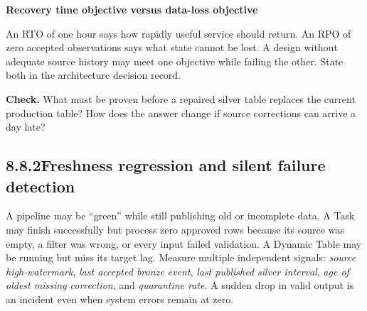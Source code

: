 \documentclass[11pt,twoside]{article}
\newcommand{\topic}[2]{\subsection*{#1\quad #2}}
\begin{document}
\begin{insight}\textbf{Recovery time objective versus data-loss objective}\par
An RTO of one hour says how rapidly useful service should return. An RPO of zero accepted observations says what state cannot be lost. A design without adequate source history may meet one objective while failing the other. State both in the architecture decision record.\end{insight}
\textbf{Check.} What must be proven before a repaired silver table replaces the current production table? How does the answer change if source corrections can arrive a day late?
\newpage
\topic{8.8.2}{Freshness regression and silent failure detection}
A pipeline may be ``green'' while still publishing old or incomplete data. A Task may finish successfully but process zero approved rows because its source was empty, a filter was wrong, or every input failed validation. A Dynamic Table may be running but miss its target lag. Measure multiple independent signals: \emph{source high-watermark}, \emph{last accepted bronze event}, \emph{last published silver interval}, \emph{age of oldest missing correction}, and \emph{quarantine rate}. A sudden drop in valid output is an incident even when system errors remain at zero.
\end{document}
